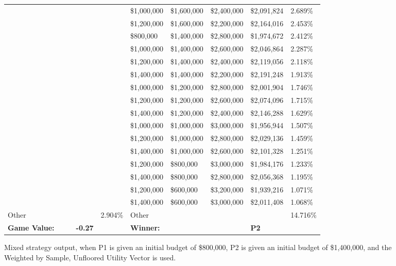\documentclass[11pt]{article}
\begin{document}
\begin{figure}
\begin{tabular}{ |p{1.0cm}p{1.0cm}p{1.0cm}p{2.0cm}|p{1.0cm}||p{1.0cm}p{1.0cm}p{1.0cm}p{2.0cm}|p{1.0cm}|}
&&&& & \$1,000,000 & \$1,600,000 & \$2,400,000 & \$2,091,824 & 2.689\% \\
&&&& & \$1,200,000 & \$1,600,000 & \$2,200,000 & \$2,164,016 & 2.453\% \\
&&&& & \$800,000 & \$1,400,000 & \$2,800,000 & \$1,974,672 & 2.412\% \\
&&&& & \$1,000,000 & \$1,400,000 & \$2,600,000 & \$2,046,864 & 2.287\% \\
&&&& & \$1,200,000 & \$1,400,000 & \$2,400,000 & \$2,119,056 & 2.118\% \\
&&&& & \$1,400,000 & \$1,400,000 & \$2,200,000 & \$2,191,248 & 1.913\% \\
&&&& & \$1,000,000 & \$1,200,000 & \$2,800,000 & \$2,001,904 & 1.746\% \\
&&&& & \$1,200,000 & \$1,200,000 & \$2,600,000 & \$2,074,096 & 1.715\% \\
&&&& & \$1,400,000 & \$1,200,000 & \$2,400,000 & \$2,146,288 & 1.629\% \\
&&&& & \$1,000,000 & \$1,000,000 & \$3,000,000 & \$1,956,944 & 1.507\% \\
&&&& & \$1,200,000 & \$1,000,000 & \$2,800,000 & \$2,029,136 & 1.459\% \\
&&&& & \$1,400,000 & \$1,000,000 & \$2,600,000 & \$2,101,328 & 1.251\% \\
&&&& & \$1,200,000 & \$800,000 & \$3,000,000 & \$1,984,176 & 1.233\% \\
&&&& & \$1,400,000 & \$800,000 & \$2,800,000 & \$2,056,368 & 1.195\% \\
&&&& & \$1,200,000 & \$600,000 & \$3,200,000 & \$1,939,216 & 1.071\% \\
&&&& & \$1,400,000 & \$600,000 & \$3,000,000 & \$2,011,408 & 1.068\% \\
\hline
Other &&&& 2.904\% & Other &&&& 14.716\% \\
\hline
\small \textbf{Game Value:} &&& \small \textbf{-0.27} && \small \textbf{Winner:} &&& \small \textbf{P2}&\\
\hline
\end{tabular}
\caption{Mixed strategy output, when P1 is given an initial budget of \$800,000, P2 is given an initial budget of \$1,400,000, and the Weighted by Sample, Unfloored Utility Vector is used.}
\label{8v14table.6}
\end{figure}
\end{document}
